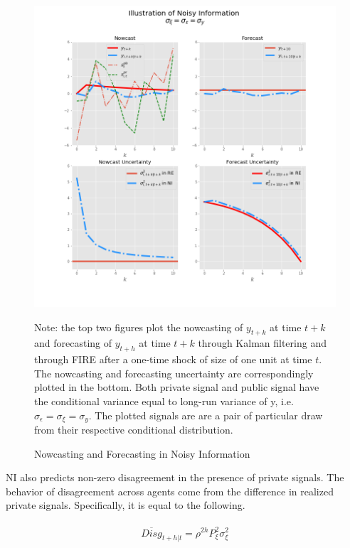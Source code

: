 \documentclass[12pt]{article}
\begin{document}
	\begin{figure}[ht]
		\centering
		\includegraphics[width=13cm]{figures/ni_illustration.png}  \\
		\begin{flushleft}
		{\footnotesize Note: the top two figures plot the nowcasting of $y_{t+k}$  at time $t+k$ and forecasting of $y_{t+h}$ at time $t+k$ through Kalman filtering and through FIRE after a one-time shock of size of one unit at time $t$. The nowcasting and forecasting uncertainty are correspondingly plotted in the bottom. Both private signal and public signal have the conditional variance equal to long-run variance of y, i.e.  $\sigma_\epsilon = \sigma_\xi = \sigma_y$. The plotted signals are are a pair of particular draw from their respective conditional distribution. }
		\end{flushleft}
		\caption{Nowcasting and Forecasting in Noisy Information}
		\label{IllustrateNI}
	\end{figure}
	
	NI also predicts non-zero disagreement in the presence of private signals. The behavior of disagreement across agents come from the difference in realized private signals. Specifically, it is equal to the following. 
	
	\begin{eqnarray}
		\begin{aligned}
			\overline {Disg}_{t+h|t} = \rho^{2h} P^2_\xi \sigma^2_\xi  
		\end{aligned}
	\end{eqnarray}
	
\end{document}
